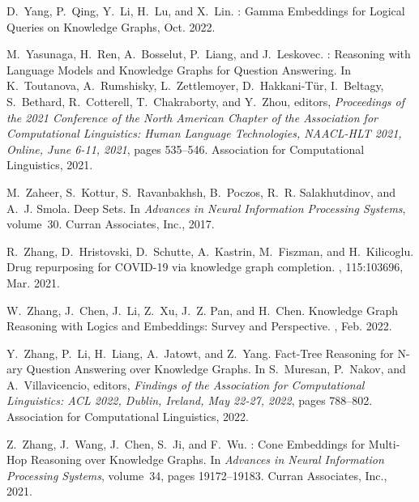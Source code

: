 \documentclass[11pt]{article}
\begin{document}
\begin{thebibliography}{10}
\begin{small}
D.~Yang, P.~Qing, Y.~Li, H.~Lu, and X.~Lin.
: {{Gamma Embeddings}} for {{Logical Queries}} on
{{Knowledge Graphs}}, Oct. 2022.

M.~Yasunaga, H.~Ren, A.~Bosselut, P.~Liang, and J.~Leskovec.
: {{Reasoning}} with {{Language Models}} and {{Knowledge
		Graphs}} for {{Question Answering}}.
\newblock In K.~Toutanova, A.~Rumshisky, L.~Zettlemoyer, D.~{Hakkani-T{\"u}r},
I.~Beltagy, S.~Bethard, R.~Cotterell, T.~Chakraborty, and Y.~Zhou, editors,
{\em Proceedings of the 2021 {{Conference}} of the {{North American Chapter}}
	of the {{Association}} for {{Computational Linguistics}}: {{Human Language
			Technologies}}, {{NAACL-HLT}} 2021, {{Online}}, {{June}} 6-11, 2021}, pages
535--546. {Association for Computational Linguistics}, 2021.

M.~Zaheer, S.~Kottur, S.~Ravanbakhsh, B.~Poczos, R.~R. Salakhutdinov, and A.~J.
Smola.
\newblock Deep {{Sets}}.
\newblock In {\em Advances in {{Neural Information Processing Systems}}},
volume~30. {Curran Associates, Inc.}, 2017.

R.~Zhang, D.~Hristovski, D.~Schutte, A.~Kastrin, M.~Fiszman, and H.~Kilicoglu.
\newblock Drug repurposing for {{COVID-19}} via knowledge graph completion.
, 115:103696, Mar. 2021.

W.~Zhang, J.~Chen, J.~Li, Z.~Xu, J.~Z. Pan, and H.~Chen.
\newblock Knowledge {{Graph Reasoning}} with {{Logics}} and {{Embeddings}}:
{{Survey}} and {{Perspective}}.
, Feb. 2022.

Y.~Zhang, P.~Li, H.~Liang, A.~Jatowt, and Z.~Yang.
\newblock Fact-{{Tree Reasoning}} for {{N-ary Question Answering}} over
{{Knowledge Graphs}}.
\newblock In S.~Muresan, P.~Nakov, and A.~Villavicencio, editors, {\em Findings
	of the {{Association}} for {{Computational Linguistics}}: {{ACL}} 2022,
	{{Dublin}}, {{Ireland}}, {{May}} 22-27, 2022}, pages 788--802. {Association
	for Computational Linguistics}, 2022.

Z.~Zhang, J.~Wang, J.~Chen, S.~Ji, and F.~Wu.
: {{Cone Embeddings}} for {{Multi-Hop Reasoning}} over
{{Knowledge Graphs}}.
\newblock In {\em Advances in {{Neural Information Processing Systems}}},
volume~34, pages 19172--19183. {Curran Associates, Inc.}, 2021.


\end{small}
\end{thebibliography}
\end{document}
